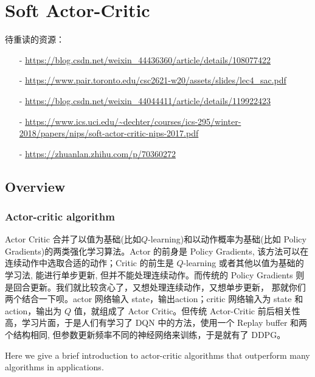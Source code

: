 ﻿\chapter{Soft Actor-Critic}


待重读的资源：
\begin{itemize}
\setlength{\parskip}{0pt}
\item[-]
\url{https://blog.csdn.net/weixin_44436360/article/details/108077422}

\item[-]
\url{https://www.pair.toronto.edu/csc2621-w20/assets/slides/lec4_sac.pdf}

\item[-]
\url{https://blog.csdn.net/weixin_44044411/article/details/119922423}

\item[-]
\url{https://www.ics.uci.edu/~dechter/courses/ics-295/winter-2018/papers/nips/soft-actor-critic-nips-2017.pdf}

\item[-]
\url{https://zhuanlan.zhihu.com/p/70360272}
\end{itemize}

\section{Overview}


\subsection{Actor-critic algorithm}

Actor Critic 合并了以值为基础(比如$Q$-learning)和以动作概率为基础(比如 Policy 
Gradients)的两类强化学习算法。Actor 的前身是 Policy Gradients, 
该方法可以在连续动作中选取合适的动作；Critic 的前生是 $Q$-learning 
或者其他以值为基础的学习法, 能进行单步更新, 但并不能处理连续动作。而传统的 Policy 
Gradients 则是回合更新。我们就比较贪心了，又想处理连续动作，又想单步更新，
那就你们两个结合一下呗。actor 网络输入 state，输出action；critic 网络输入为 state
和 action，输出为 $Q$ 值，就组成了 Actor Critic。但传统 Actor-Critic 
前后相关性高，学习片面，于是人们有学习了 DQN 中的方法，使用一个 Replay buffer 
和两个结构相同, 但参数更新频率不同的神经网络来训练，于是就有了 DDPG。

Here we give a brief introduction to actor-critic algorithms that 
outperform many algorithms in applications.


